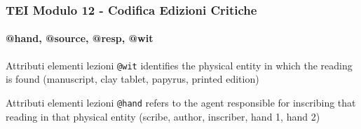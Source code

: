 \begin{frame}
    \frametitle{TEI Modulo 12 - Codifica Edizioni Critiche}
    \framesubtitle{@hand, @source, @resp, @wit}
    \addtocounter{nframe}{1}





    \begin{block}{Attributi elementi lezioni}
        \texttt{@wit} identifies the physical entity in which the reading is found (manuscript, clay tablet, papyrus, printed edition)
    \end{block}

    \begin{block}{Attributi elementi lezioni}
        \texttt{@hand} refers to the agent responsible for inscribing that reading in that physical entity (scribe, author, inscriber, hand 1, hand 2) 
    \end{block}


\end{frame}


